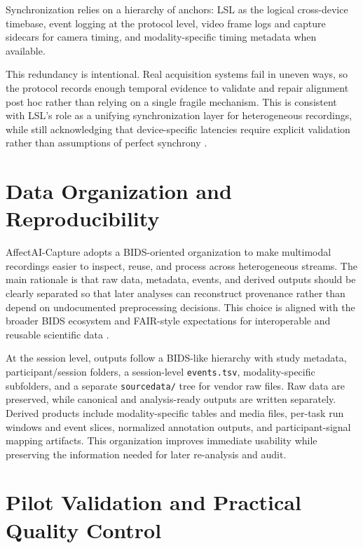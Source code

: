 \documentclass[runningheads]{llncs}
\begin{document}

\noindent Synchronization relies on a hierarchy of anchors: LSL as the logical cross-device timebase, event logging at the protocol level, video frame logs and capture sidecars for camera timing, and modality-specific timing metadata when available.

This redundancy is intentional. Real acquisition systems fail in uneven ways, so the protocol records enough temporal evidence to validate and repair alignment post hoc rather than relying on a single fragile mechanism. This is consistent with LSL's role as a unifying synchronization layer for heterogeneous recordings, while still acknowledging that device-specific latencies require explicit validation rather than assumptions of perfect synchrony \cite{kothe2024_lsl}.

\section{Data Organization and Reproducibility}

AffectAI-Capture adopts a BIDS-oriented organization to make multimodal recordings easier to inspect, reuse, and process across heterogeneous streams. The main rationale is that raw data, metadata, events, and derived outputs should be clearly separated so that later analyses can reconstruct provenance rather than depend on undocumented preprocessing decisions. This choice is aligned with the broader BIDS ecosystem and FAIR-style expectations for interoperable and reusable scientific data \cite{gorgolewski2016_bids,pernet2019_eegbids,wilkinson2016_fair}.

At the session level, outputs follow a BIDS-like hierarchy with study metadata, participant/session folders, a session-level \texttt{events.tsv}, modality-specific subfolders, and a separate \texttt{sourcedata/} tree for vendor raw files. Raw data are preserved, while canonical and analysis-ready outputs are written separately. Derived products include modality-specific tables and media files, per-task run windows and event slices, normalized annotation outputs, and participant-signal mapping artifacts. This organization improves immediate usability while preserving the information needed for later re-analysis and audit.

\section{Pilot Validation and Practical Quality Control}
\end{document}
